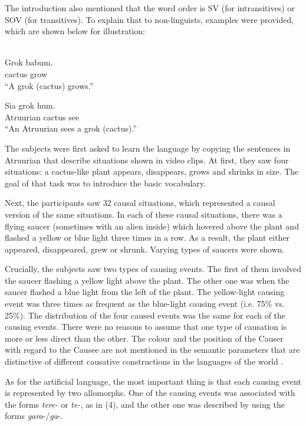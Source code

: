 \documentclass[output=paper]{langsci/langscibook}
\begin{document}
The introduction also mentioned that the word order is SV (for intransitives) or SOV (for transitives). To explain that to non-linguists, examples were provided, which are shown below for illustration: 

\ea\label{ex:levshina:} 
 \\
\gll Grok         babum.\\
     cactus      grow\\
\glt “A grok (cactus) grows.”      
\z

\ea
\gll Sia                 grok            hum.\\
     Atruurian      cactus        see\\
\glt “An Atruurian sees a grok (cactus).”
\z

The subjects were first asked to learn the language by copying the sentences in Atruurian that describe situations shown in video clips. At first, they saw four situations: a cactus-like plant appears, disappears, grows and shrinks in size. The goal of that task was to introduce the basic vocabulary. 

Next, the participants saw 32 causal situations, which represented a causal version of the same situations. In each of these causal situations, there was a flying saucer (sometimes with an alien inside) which hovered above the plant and flashed a yellow or blue light three times in a row. As a result, the plant either appeared, disappeared, grew or shrunk. Varying types of saucers were shown. 

Crucially, the subjects saw two types of causing events. The first of them involved the saucer flashing a yellow light above the plant. The other one was when the saucer flashed a blue light from the left of the plant. The yellow-light causing event was three times as frequent as the blue-light causing event (i.e. 75\% vs. 25\%). The distribution of the four caused events was the same for each of the causing events. There were no reasons to assume that one type of causation is more or less direct than the other. The colour and the position of the Causer with regard to the Causee are not mentioned in the semantic parameters that are distinctive of different causative constructions in the languages of the world \citep{Levshina2017}. 

As for the artificial language, the most important thing is that each causing event is represented by two allomorphs. One of the causing events was associated with the forms \textit{tere-} or \textit{te-}, as in (4), and the other one was described by using the forms \textit{gara}{}-/\textit{ga}{}-.
\end{document}
